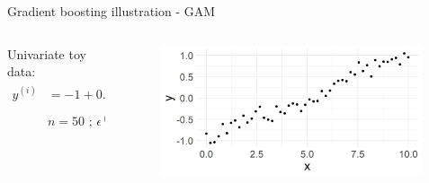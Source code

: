 \begin{vbframe}{Gradient boosting illustration - GAM}
\begin{columns}[c]
\begin{column}{0.5\textwidth}
\footnotesize
Univariate toy data: 
\vspace{-0.2cm}
\begin{align*}
y^{(i)} &=  -1 + 0.2 \cdot x^{(i)} + 0.1 \cdot sin(x^{(i)}) + \epsilon^{(i)} \\
& n = 50 \text{ ; } \epsilon^{(i)} \sim \mathcal{N}(0, 0.1) \quad 
\end{align*}
\end{column}
\begin{column}{0.5\textwidth}
\begin{figure}
  \includegraphics[width = 0.99\textwidth]{figure/illustration_data_normal.png}
\end{figure}
\end{column}
\end{columns}





\end{vbframe}


